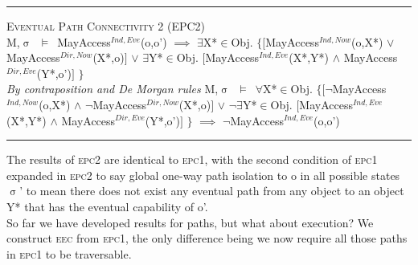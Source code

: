 \documentclass[a4paper,11pt, twoside,twocolumn]{article}
\newenvironment{logic}[1][null]
{\begin{flushleft} \small \label{#1}}
{\end{flushleft}}
\newcommand{\loin}{$\in$}
\newcommand{\loforall}{$\forall$}
\newcommand{\loexists}{$\exists$}
\newcommand{\loand}{$\land$}
\newcommand{\loor} {$\lor$}
\newcommand{\loimplies}{$\implies$}
\newcommand{\losigma}{$\upsigma$}
\newcommand{\loturns} {$\vDash$}
\newcommand{\loneg}{$\boldsymbol \neg$}
\newcommand{\ablock} {\null\qquad}
\begin{document}
\begin{logic}
\hrule\null
\textsc{\normalsize *Eventual Path Connectivity 2 (EPC2)}\\
M,\losigma\ \loturns\ 
MayAccess$^{Ind,Eve}$(o,o')\linebreak
\ablock \loimplies \linebreak
\ablock \loexists X*\loin Obj. $\{[$MayAccess$^{Ind,Now}$(o,X*) \loor \linebreak
\ablock \ablock \ablock  \ablock MayAccess$^{Dir,Now}$(X*,o)$]$\linebreak
\ablock \ablock \ablock \ablock \loor \linebreak
\ablock \ablock \quad \loexists Y*\loin Obj. $[$MayAccess$^{Ind,Eve}$(X*,Y*) \loand\linebreak
\ablock \ablock \ablock \ablock \ablock MayAccess$^{Dir,Eve}$(Y*,o')$]$\linebreak
\ablock \ablock \ablock \ablock  $\}$\linebreak
\linebreak \\
\textit{By contraposition and De Morgan rules}\linebreak
M,\losigma\ \loturns\ 
\loforall X*\loin Obj. $\{[$\loneg MayAccess$^{Ind,Now}$(o,X*) \loand \linebreak
\ablock \ablock \ablock \ablock \quad \loneg MayAccess$^{Dir,Now}$(X*,o)$]$\linebreak
\ablock \ablock \ablock \ablock \loor \linebreak
\ablock \ablock \loneg \loexists Y*\loin Obj. $[$MayAccess$^{Ind,Eve}$(X*,Y*) \loand\linebreak
\ablock \ablock \ablock \ablock \ablock MayAccess$^{Dir,Eve}$(Y*,o')$]$\linebreak
\ablock \ablock \ablock \ablock  $\}$\linebreak
\ablock \loimplies\linebreak
\ablock \loneg MayAccess$^{Ind,Eve}$(o,o')\
\linebreak
\hrule
\end{logic}
The results of \textsc{epc2} are identical to \textsc{epc1}, with the second condition of \textsc{epc1} expanded in \textsc{epc2} to say global one-way path isolation to o in all possible states \losigma' to mean there does not exist any eventual path from any object to an object Y* that has the eventual capability of o'.\\

So far we have developed results for paths, but what about execution? We construct \textsc{eec} from \textsc{epc1}, the only difference being we now require all those paths in \textsc{epc1} to be traversable.
\end{document}
